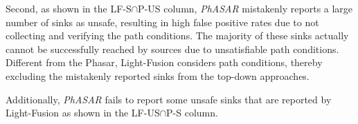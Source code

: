 Second, as shown in the LF-S$\cap$P-US column, \textit{PhASAR} mistakenly reports a large number of sinks as unsafe, resulting in high false positive rates due to not collecting and verifying the path conditions.
The majority of these sinks actually cannot be successfully reached by sources due to unsatisfiable path conditions.
Different from the Phasar, Light-Fusion considers path conditions, thereby excluding the mistakenly reported sinks from the top-down approaches. 

Additionally, \textit{PhASAR} fails to report some unsafe sinks that are reported by Light-Fusion as shown in the LF-US$\cap$P-S column.